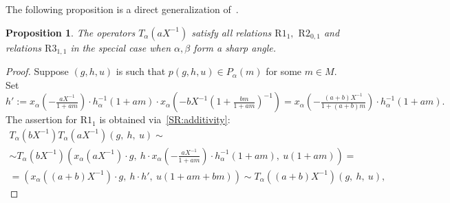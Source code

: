 \documentclass[oneside, 8pt]{amsart}
\newtheorem{prop}{Proposition}
\theoremstyle{remark}
\theoremstyle{definition}
\numberwithin{equation}{section}
\begin{document}
The following proposition is a direct generalization of~\cite[Proposition~4.3]{Tu83}.
\begin{prop} The operators $T_\alpha(aX^{-1})$ satisfy all relations $\text{R1}_1, $ $\text{R2}_{0,1}$ and relations $\text{R3}_{1,1}$ in the special case when $\alpha, \beta$ form a sharp angle.
\end{prop}
\begin{proof}
Suppose $(g, h, u)$ is such that $p(g, h, u) \in P_\alpha(m)$ for some $m \in M$.
Set $h' := x_\alpha\left(-\tfrac{aX^{-1}}{1+am}\right) \cdot h^{-1}_\alpha(1+am) \cdot x_\alpha\left(-bX^{-1}\left(1 + \tfrac{bm}{1+am}\right)^{-1}\right) =
  x_\alpha\left(- \tfrac{(a+b)X^{-1}}{1 + (a + b)m}\right) \cdot h^{-1}_\alpha(1+am).$
The assertion for $\text{R1}_1$ is obtained via~\cref{SR:additivity}:
\begin{multline} \nonumber T_\alpha(bX^{-1}) T_\alpha(aX^{-1}) \left(g,\ h,\ u\right) \sim \\ \sim
T_\alpha(bX^{-1}) \left(x_\alpha(aX^{-1})\cdot g,\ h \cdot x_\alpha\left(-\tfrac{aX^{-1}}{1 + am}\right) \cdot h^{-1}_\alpha(1 + am),\ u(1 + am)\right) = \\
 = \left( x_\alpha\left((a+b)X^{-1}\right)\cdot g,\ h \cdot h',\ u(1 + am + bm) \right) \sim T_\alpha((a+b)X^{-1}) \left( g,\ h,\ u\right), \end{multline} 


\end{proof}
\end{document}
